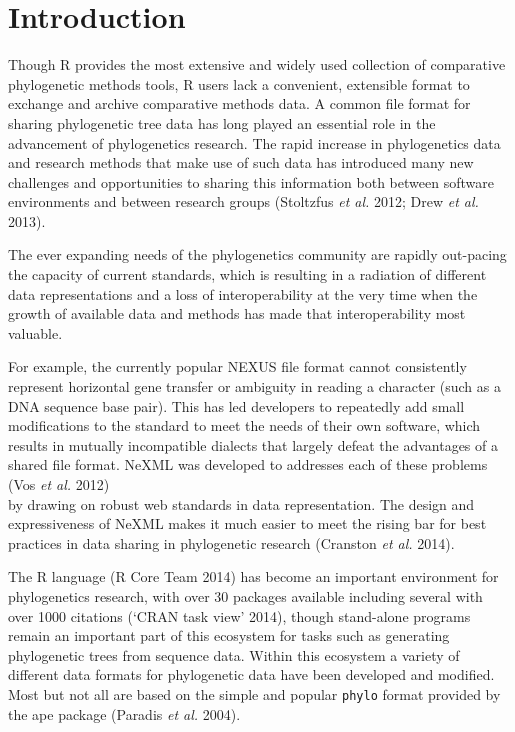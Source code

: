 \documentclass[author-year, review, 11pt]{components/elsarticle} %
\begin{document}
\section{Introduction}\label{introduction}

Though R provides the most extensive and widely used collection of
comparative phylogenetic methods tools, R users lack a convenient,
extensible format to exchange and archive comparative methods data. A
common file format for sharing phylogenetic tree data has long played an
essential role in the advancement of phylogenetics research. The rapid
increase in phylogenetics data and research methods that make use of
such data has introduced many new challenges and opportunities to
sharing this information both between software environments and between
research groups (Stoltzfus \emph{et al.} 2012; Drew \emph{et al.} 2013).

The ever expanding needs of the phylogenetics community are rapidly
out-pacing the capacity of current standards, which is resulting in a
radiation of different data representations and a loss of
interoperability at the very time when the growth of available data and
methods has made that interoperability most valuable.

For example, the currently popular NEXUS file format cannot consistently
represent horizontal gene transfer or ambiguity in reading a character
(such as a DNA sequence base pair). This has led developers to
repeatedly add small modifications to the standard to meet the needs of
their own software, which results in mutually incompatible dialects that
largely defeat the advantages of a shared file format. NeXML was
developed to addresses each of these problems (Vos \emph{et al.}
2012)\\by drawing on robust web standards in data representation. The
design and expressiveness of NeXML makes it much easier to meet the
rising bar for best practices in data sharing in phylogenetic research
(Cranston \emph{et al.} 2014).

The R language (R Core Team 2014) has become an important environment
for phylogenetics research, with over 30 packages available including
several with over 1000 citations (`CRAN task view' 2014), though
stand-alone programs remain an important part of this ecosystem for
tasks such as generating phylogenetic trees from sequence data. Within
this ecosystem a variety of different data formats for phylogenetic data
have been developed and modified. Most but not all are based on the
simple and popular \texttt{phylo} format provided by the ape package
(Paradis \emph{et al.} 2004).
\end{document}
